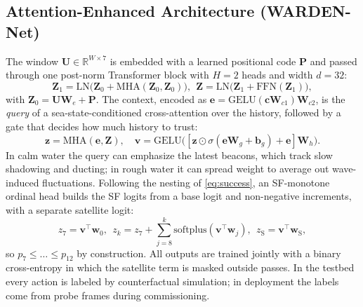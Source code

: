 \documentclass[journal]{IEEEtran}\def\WARDENieee{1}%
\begin{document}
\subsection{Attention-Enhanced Architecture (WARDEN-Net)}
The window $\mathbf{U}\in\mathbb{R}^{W\times7}$ is embedded with a learned positional code $\mathbf{P}$ and passed through one post-norm Transformer block with $H=2$ heads and width $d=32$:
\begin{equation}
\mathbf{Z}_1=\mathrm{LN}\big(\mathbf{Z}_0+\mathrm{MHA}(\mathbf{Z}_0,\mathbf{Z}_0)\big),\ \ \mathbf{Z}=\mathrm{LN}\big(\mathbf{Z}_1+\mathrm{FFN}(\mathbf{Z}_1)\big),\label{eq:enc}
\end{equation}
with $\mathbf{Z}_0=\mathbf{U}\mathbf{W}_e+\mathbf{P}$. The context, encoded as $\mathbf{e}=\mathrm{GELU}(\mathbf{c}\mathbf{W}_{c1})\mathbf{W}_{c2}$, is the \emph{query} of a sea-state-conditioned cross-attention over the history, followed by a gate that decides how much history to trust:
\begin{equation}
\mathbf{z}=\mathrm{MHA}(\mathbf{e},\mathbf{Z}),\quad \mathbf{v}=\mathrm{GELU}\big([\mathbf{z}\odot\sigma(\mathbf{e}\mathbf{W}_g+\mathbf{b}_g)+\mathbf{e}]\mathbf{W}_h\big).\label{eq:cross}
\end{equation}
In calm water the query can emphasize the latest beacons, which track slow shadowing and ducting; in rough water it can spread weight to average out wave-induced fluctuations. Following the nesting of \eqref{eq:success}, an SF-monotone ordinal head builds the SF logits from a base logit and non-negative increments, with a separate satellite logit:
\begin{equation}
z_7=\mathbf{v}^\top\mathbf{w}_0,\ \ z_k=z_7+\textstyle\sum_{j=8}^{k}\mathrm{softplus}(\mathbf{v}^\top\mathbf{w}_j),\ \ z_{\mathrm S}=\mathbf{v}^\top\mathbf{w}_{\mathrm S},\label{eq:head}
\end{equation}
so $p_7\le\dots\le p_{12}$ by construction. All outputs are trained jointly with a binary cross-entropy in which the satellite term is masked outside passes. In the testbed every action is labeled by counterfactual simulation; in deployment the labels come from probe frames during commissioning.
\end{document}
